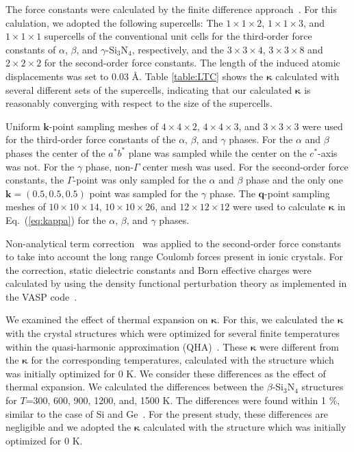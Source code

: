 \documentclass[twocolumn,amsmath,amssymb,a4paper,prb,superscriptaddress,floatfix]{revtex4-1}
\begin{document}
The force constants were calculated by the finite difference
approach~\cite{wei-supercell}. For this calulation, we adopted the following
supercells: The $1\times 1\times2$, $1\times 1\times3$, and $1\times 1\times1$
supercells of the conventional unit cells for the third-order force constants of
$\alpha$, $\beta$, and $\gamma$-Si$_3$N$_4$, respectively, and the $3\times
3\times4$, $3\times 3\times8$ and $2\times 2\times2$ for the second-order force
constants.  The length of the induced atomic displacements was set to 0.03 \AA.
Table \ref{table:LTC} shows the $\boldsymbol{\kappa}$  calculated with several
different sets of the supercells, indicating that our calculated
$\boldsymbol{\kappa}$ is reasonably converging with respect to the size of the
supercells. 

Uniform $\mathbf{k}$-point sampling meshes of $4\times 4\times 2$, $4\times
4\times 3$, and $3\times 3\times 3$ were used for the third-order force
constants of the $\alpha$, $\beta$, and $\gamma$ phases. For the $\alpha$ and
$\beta$ phases the center of the $a^*b^*$ plane was sampled while the center on
the $c^*$-axis was not. For the $\gamma$ phase, non-$\Gamma$ center mesh was
used. For the second-order force constants, the $\Gamma$-point was only sampled
for the $\alpha$ and $\beta$ phase and the only one $\mathbf{k}=(0.5, 0.5, 0.5)$
point was sampled for the $\gamma$ phase. The $\mathbf{q}$-point sampling meshes
of $10\times 10\times 14$, $10\times 10\times 26$, and $12\times 12\times 12$
were used to calculate $\boldsymbol{\kappa}$ in Eq.~(\ref{eq:kappa}) for the
$\alpha$, $\beta$, and $\gamma$ phases.

Non-analytical term correction~\cite{wang} was applied to the second-order force
constants to take into account the long range Coulomb forces present in ionic
crystals. For the correction, static dielectric constants and Born effective
charges were calculated by using the density functional perturbation theory
as implemented in the VASP code~\cite{vasp-lepsiron,lepsiron}.

We examined the effect of thermal expansion on $\boldsymbol{\kappa}$. For this,
we calculated the $\boldsymbol{\kappa}$ with the crystal structures which were
optimized for several finite temperatures within the quasi-harmonic
approximation (QHA)~\cite{dove-p76}. These $\boldsymbol{\kappa}$ were different
from the $\boldsymbol{\kappa}$ for the corresponding temperatures, calculated
with the structure which was initially optimized for 0 K. We consider these
differences as the effect of thermal expansion.  We calculated the differences
between the $\beta$-Si$_3$N$_4$ structures for $T$=300, 600, 900, 1200, and,
1500 K. The differences were found within 1 \%, similar to the case of Si and
Ge~\cite{ward-ltc}. For the present study, these differences are negligible and
we adopted the $\boldsymbol{\kappa}$ calculated with the structure which was
initially optimized for 0 K.
\end{document}
